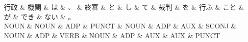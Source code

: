 \documentclass[tikz,border=5pt]{standalone}
\begin{document}
\normalsize
\begin{dependency}[edge unit distance=12.0pt]
    \begin{deptext}[column sep=1em]
        行政 \& 機関 \& は \& 、 \& 終審 \& と \& し \& て \& 裁判 \& を \& 行ふ \& こと \& が \& でき \& ない \& 。\\
        NOUN \& NOUN \& ADP \& PUNCT \& NOUN \& ADP \& AUX \& SCONJ \& NOUN \& ADP \& VERB \& NOUN \& ADP \& AUX \& AUX \& PUNCT\\
    \end{deptext}
\end{dependency}
\end{document}
